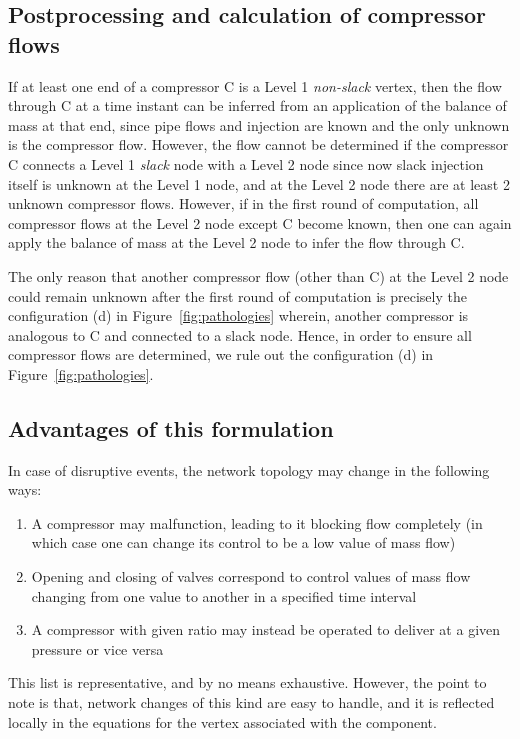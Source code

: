\documentclass{amsart}
\begin{document}
\subsection{Postprocessing and calculation of compressor flows}
\label{sec:compressor-flow}
If at least one end of a compressor C is a Level 1 \emph{non-slack} vertex, then the flow through C at a time instant can be  inferred from an application of the  balance of mass at that end, since pipe flows and injection are known and the only unknown is the compressor flow. 
However, the flow cannot be determined if the compressor C connects a Level 1 \emph{slack} node with a Level 2 node since now  slack injection itself is unknown at the Level 1 node, and at the Level 2 node there are at least 2 unknown compressor flows. However, if in the first round of computation, all compressor flows at the Level 2 node except C become known, then one can again apply the balance of mass at the Level 2 node to infer the flow through C. 

The only reason that another compressor flow (other than C) at the Level 2 node  could remain unknown after the first round of computation is precisely the configuration (d) in Figure~\ref{fig:pathologies} wherein, another compressor is analogous to C and connected to a slack node.
Hence, in order to ensure all compressor flows  are determined, we  rule out the configuration (d) in Figure~\ref{fig:pathologies}.

\subsection{Advantages of this formulation}
In case of disruptive events, the network topology may change in the following ways:
\begin{enumerate}
\item A compressor may malfunction, leading to it blocking flow completely (in which case one can change its control to be a low value of mass flow)
\item Opening and closing of valves correspond to control values of mass flow changing from one value to another in a specified time interval
\item A compressor with given ratio may instead be operated to  deliver at a given pressure or vice versa
\end{enumerate}
This list is representative, and by no means exhaustive. However, the point to note is that, network changes of this kind are easy to handle, and it is reflected locally in the equations for the vertex associated with the component.
\end{document}
